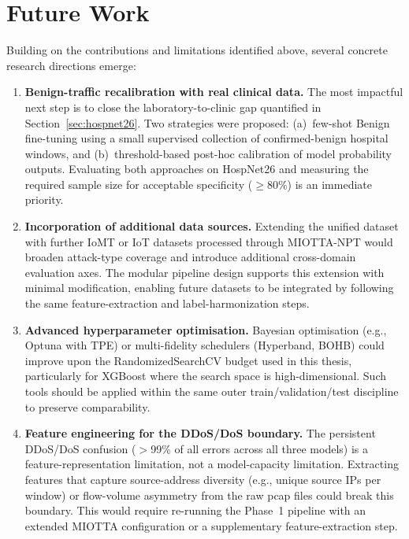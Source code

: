 \section{Future Work}
\label{sec:future-work}

Building on the contributions and limitations identified above, several concrete research directions emerge:

\begin{enumerate}[nosep]
  \item \textbf{Benign-traffic recalibration with real clinical data.}
  The most impactful next step is to close the laboratory-to-clinic gap quantified in Section~\ref{sec:hospnet26}. Two strategies were proposed: (a)~few-shot Benign fine-tuning using a small supervised collection of confirmed-benign hospital windows, and (b)~threshold-based post-hoc calibration of model probability outputs. Evaluating both approaches on HospNet26 and measuring the required sample size for acceptable specificity ($\geq$80\%) is an immediate priority.

  \item \textbf{Incorporation of additional data sources.}
  Extending the unified dataset with further IoMT or IoT datasets processed through MIOTTA-NPT would broaden attack-type coverage and introduce additional cross-domain evaluation axes. The modular pipeline design supports this extension with minimal modification, enabling future datasets to be integrated by following the same feature-extraction and label-harmonization steps.

  \item \textbf{Advanced hyperparameter optimisation.}
  Bayesian optimisation (e.g., Optuna with TPE) or multi-fidelity schedulers (Hyperband, BOHB) could improve upon the RandomizedSearchCV budget used in this thesis, particularly for XGBoost where the search space is high-dimensional. Such tools should be applied within the same outer train/validation/test discipline to preserve comparability.

  \item \textbf{Feature engineering for the DDoS/DoS boundary.}
  The persistent DDoS/DoS confusion ($>$99\% of all errors across all three models) is a feature-representation limitation, not a model-capacity limitation. Extracting features that capture source-address diversity (e.g., unique source IPs per window) or flow-volume asymmetry from the raw pcap files could break this boundary. This would require re-running the Phase~1 pipeline with an extended MIOTTA configuration or a supplementary feature-extraction step.


\end{enumerate}
